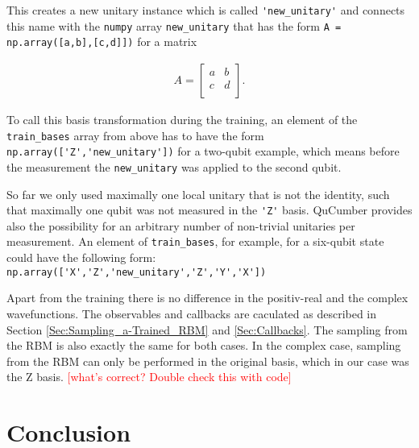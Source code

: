 \documentclass[submission, Phys]{SciPost}
\begin{document}
This creates a new unitary instance which is called \verb|'new_unitary'| and connects this name with the \verb|numpy| array 
\verb|new_unitary| that has the form \verb|A = np.array([a,b],[c,d]])| for a matrix 

\begin{align}
A = 
\begin{bmatrix}
a &b \\
c &d \\ 
\end{bmatrix}.
\end{align} 

To call this basis transformation during the training, an element of the \verb|train_bases| array from above has to have the form 
\verb|np.array(['Z','new_unitary'])| for a two-qubit example, 
which means before the measurement the \verb|new_unitary| was applied to the second qubit.

So far we only used maximally one local unitary that is not the identity, such that maximally one qubit was not measured in the \verb|'Z'| basis. 
QuCumber provides also the possibility for an arbitrary number of non-trivial unitaries per measurement. 
An element of \verb|train_bases|, for example, for a six-qubit state could have the following form:
\verb|np.array(['X','Z','new_unitary','Z','Y','X'])|

Apart from the training there is no difference in the positiv-real and the complex wavefunctions. The observables and callbacks are caculated as described in Section \ref{Sec:Sampling_a-Trained_RBM} and \ref{Sec:Callbacks}.
The sampling from the RBM is also exactly the same for both cases. 
In the complex case, sampling from the RBM can only be performed in the original basis, which in our case was the Z basis.
\textcolor{red}{[what's correct? Double check this with code]}
%

\section{Conclusion}
\end{document}
